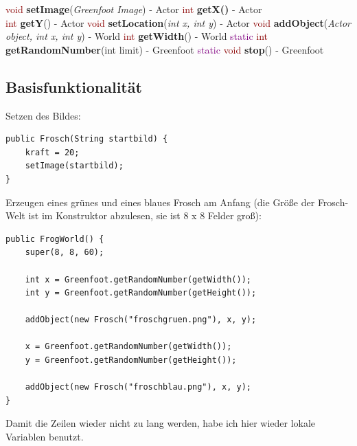 \documentclass{scrartcl}   %
\begin{document}
\begin{itemize}
    \barrow \textcolor{darkred}{void} \textbf{setImage}(\textit{Greenfoot Image}) - Actor
    \barrow \textcolor{darkred}{int} \textbf{getX()} - Actor\\
    \textcolor{darkred}{int} \textbf{getY}() - Actor
    \barrow \textcolor{darkred}{void} \textbf{setLocation}(\textit{int x, int y}) - Actor
    \barrow \textcolor{darkred}{void} \textbf{addObject}(\textit{Actor object, int x, int y}) - World
    \barrow \textcolor{darkred}{int} \textbf{getWidth}() - World
    \barrow \textcolor{purple}{static} \textcolor{darkred}{int} \textbf{getRandomNumber}(int limit) - Greenfoot
    \barrow \textcolor{purple}{static} \textcolor{darkred}{void} \textbf{stop}() - Greenfoot
\end{itemize}

\newpage

\subsection{Basisfunktionalität}

\begin{itemize}
    \barrow Setzen des Bildes:\\
    \begin{lstlisting}
public Frosch(String startbild) {
    kraft = 20;
    setImage(startbild);
}
    \end{lstlisting}
    \barrow Erzeugen eines grünes und eines blaues Frosch am Anfang (die Größe der Frosch-Welt ist im Konstruktor abzulesen, sie ist 8 x 8 Felder groß):\\
    \begin{lstlisting}
public FrogWorld() {    
    super(8, 8, 60);
    
    int x = Greenfoot.getRandomNumber(getWidth());
    int y = Greenfoot.getRandomNumber(getHeight());
    
    addObject(new Frosch("froschgruen.png"), x, y);
    
    x = Greenfoot.getRandomNumber(getWidth());
    y = Greenfoot.getRandomNumber(getHeight());
    
    addObject(new Frosch("froschblau.png"), x, y);
}
    \end{lstlisting}
    
    Damit die Zeilen wieder nicht zu lang werden, habe ich hier wieder lokale Variablen benutzt.
\end{itemize}

\newpage
\end{document}
